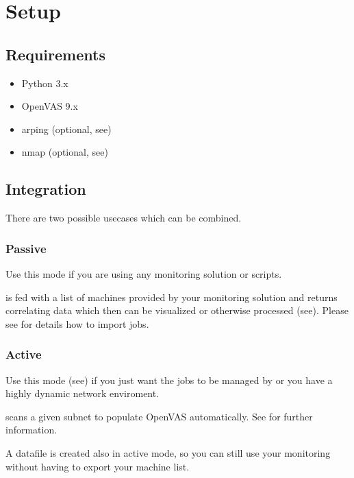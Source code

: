 \section{Setup}

\breakpoint\subsection{Requirements}\label{sec:requirements}
\begin{itemize}
\item Python 3.x
\item OpenVAS 9.x
\item arping (optional, see)
\item nmap (optional, see)
\end{itemize}

\breakpoint\subsection{Integration}\label{sec:integration}

There are two possible usecases which can be combined.

\subsubsection{Passive}\label{sec:passive}
Use this mode if you are using any monitoring solution or scripts.

\sw is fed with a list of machines provided by your monitoring solution and returns correlating data which then can be visualized or otherwise processed (see). Please see  for details how to import jobs.


\subsubsection{Active}\label{sec:active}
Use this mode (see) if you just want the jobs to be managed by \sw or you have a highly dynamic network enviroment.

\sw scans a given subnet to populate OpenVAS automatically. See  for further information.

\hint A datafile is created also in active mode, so you can still use your monitoring without having to export your machine list.

